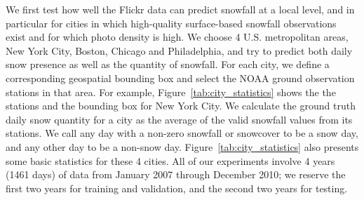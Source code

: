 We first test how well the Flickr data can predict snowfall at a local
level, and in particular for cities in which high-quality
surface-based snowfall observations exist and for which photo density is high.
%
%
We choose 4 U.S. metropolitan areas, New York City, Boston, Chicago and
Philadelphia, and try to predict both daily snow presence as well as
the quantity of snowfall.  For each city, we define a corresponding
geospatial bounding box and select the NOAA ground observation stations in that area. 
For example, 
Figure~\ref{tab:city_statistics} shows the the stations 
and the bounding box for 
New York City. We calculate the ground truth daily snow quantity for a city as the average of
the valid 
snowfall values from its stations.
We call any day with a non-zero snowfall or snowcover to be a snow day,
and any other day to be a non-snow day.
Figure~\ref{tab:city_statistics} also presents some basic statistics for
these 4 cities.  All of our experiments involve 4 years (1461 days) of
data from January 2007 through December 2010; we reserve the first two
years for training and validation, and the second two years for
testing.


